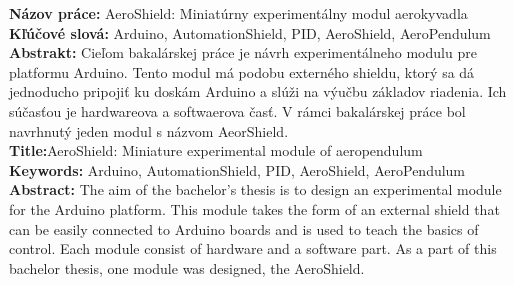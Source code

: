 \noindent
\textbf{Názov práce:} AeroShield: Miniatúrny experimentálny modul aerokyvadla\\
\textbf{Kľúčové slová: } Arduino, AutomationShield, PID, AeroShield, AeroPendulum \\
\textbf{Abstrakt: } Cieľom bakalárskej práce je návrh experimentálneho modulu pre platformu Arduino. Tento modul má podobu externého shieldu, ktorý sa dá jednoducho pripojiť ku doskám Arduino a slúži na výučbu základov riadenia. Ich súčasťou je hardwareova a softwaerova časť. V rámci bakalárskej práce bol navrhnutý jeden modul s názvom AeorShield.   \\

\noindent
\textbf{Title:}AeroShield: Miniature experimental module of aeropendulum \\
\textbf{Keywords: }  Arduino, AutomationShield, PID, AeroShield, AeroPendulum\\
\textbf{Abstract: } The aim of the bachelor's thesis is to design an experimental module for the Arduino platform. This module takes the form of an external shield that can be easily connected to Arduino boards and is used to teach the basics of control. Each module consist of hardware and a software part. As a part of this bachelor thesis, one module was designed, the AeroShield.
\cleardoublepage
